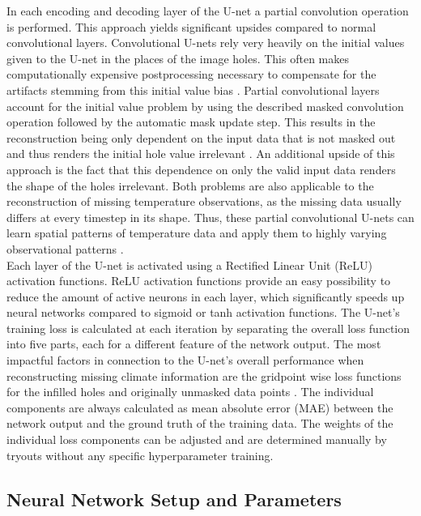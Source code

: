 \documentclass[Masterarbeit.tex]{subfile}
\begin{document}
	
	In each encoding and decoding layer of the U-net a partial convolution operation is performed. This approach yields significant upsides compared to normal convolutional layers. Convolutional U-nets rely very heavily on the initial values given to the U-net in the places of the image holes. This often makes computationally expensive postprocessing necessary to compensate for the artifacts stemming from this initial value bias \citep{liu_image_2018}. Partial convolutional layers account for the initial value problem by using the described masked convolution operation followed by the automatic mask update step. This results in the reconstruction being only dependent on the input data that is not masked out and thus renders the initial hole value irrelevant \citep{liu_image_2018}. An additional upside of this approach is the fact that this dependence on only the valid input data renders the shape of the holes irrelevant. Both problems are also applicable to the reconstruction of missing temperature observations, as the missing data usually differs at every timestep in its shape. Thus, these partial convolutional U-nets can learn spatial patterns of temperature data and apply them to highly varying observational patterns \cite{kadow_artificial_2020}.\\
	Each layer of the U-net is activated using a Rectified Linear Unit (ReLU) activation functions. ReLU activation functions provide an easy possibility to reduce the amount of active neurons in each layer, which significantly speeds up neural networks compared to sigmoid or tanh activation functions. The U-net's training loss is calculated at each iteration by separating the overall loss function into five parts, each for a different feature of the network output. The most impactful factors in connection to the U-net's overall performance when reconstructing missing climate information  are the gridpoint wise loss functions for the infilled holes and originally unmasked data points \citep{plesiat_personal_2022}. The individual components are always calculated as mean absolute error (MAE) between the network output and the ground truth of the training data. The weights of the individual loss components can be adjusted and are determined manually by tryouts without any specific hyperparameter training. \\
	
	\subsection{Neural Network Setup and Parameters}
	
\end{document}
